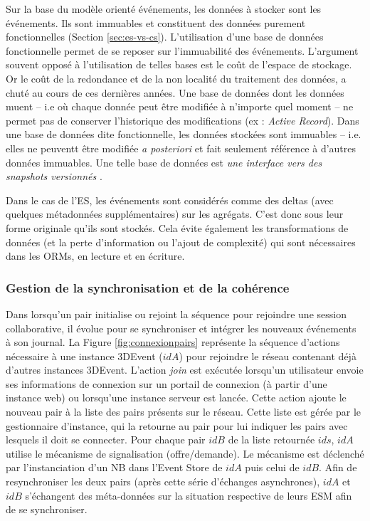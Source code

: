 Sur la base du modèle orienté événements, les données à stocker sont les 
événements. Ils sont immuables et constituent des données purement 
fonctionnelles (Section \ref{sec:es-vs-cs}).
L'utilisation d'une base de données fonctionnelle permet de se reposer sur 
l'immuabilité des événements.
L'argument souvent opposé à l'utilisation de telles bases est le coût de l'espace de 
stockage. Or le coût de la redondance et de la non localité du traitement des 
données, a chuté au cours de ces dernières années. 
Une base de données dont les données muent -- i.e où chaque donnée peut être 
modifiée à n'importe quel moment -- ne permet pas de conserver l'historique des 
modifications (ex : \textit{Active Record}). Dans une base de données dite 
fonctionnelle, les données stockées sont immuables -- i.e. elles ne peuventt être modifiée \textit{a posteriori} et fait seulement référence à 
d'autres données immuables. Une telle base de données est \og \textit{une interface vers 
des \textit{snapshots} versionnés}\fg{} \cite{Meric2012}.

Dans le cas de l'\gls{ES}, les événements sont considérés comme des deltas 
(avec quelques métadonnées supplémentaires) sur les agrégats. C'est donc sous 
leur forme originale qu'ils sont stockés. Cela évite également les transformations 
de données (et la perte d'information ou l'ajout de complexité) qui sont nécessaires 
dans les \glspl{ORM}, en lecture et en écriture.

\subsubsection{Gestion de la synchronisation et de la cohérence}
Dans \cite{Desprat2017} lorsqu'un pair initialise ou rejoint la séquence pour 
rejoindre une session collaborative, il évolue pour se synchroniser et intégrer les 
nouveaux événements à son journal.
La Figure \ref{fig:connexionpairs} représente la séquence d'actions nécessaire à 
une instance 3DEvent ($idA$) pour rejoindre le réseau contenant déjà d'autres 
instances 3DEvent. L'action \textit{join} est exécutée lorsqu'un utilisateur envoie 
ses informations de connexion sur un portail de connexion (à partir d'une instance 
web) ou lorsqu'une instance serveur est lancée. Cette action ajoute le nouveau 
pair à la liste des pairs présents sur le réseau. Cette liste est gérée par le 
gestionnaire d'instance, qui la retourne au pair pour lui indiquer les pairs 
avec lesquels il doit se connecter.
Pour chaque pair $idB$ de la liste retournée $ids$, $idA$ utilise le mécanisme de 
signalisation (offre/demande). Le mécanisme est déclenché par l'instanciation d'un 
\gls{NB} dans l'Event Store de $idA$ puis celui de $idB$. Afin de resynchroniser 
les deux pairs (après cette série d'échanges asynchrones), $idA$ et $idB$ 
s'échangent des méta-données sur la situation respective de leurs \gls{ESM} 
afin de se synchroniser.


